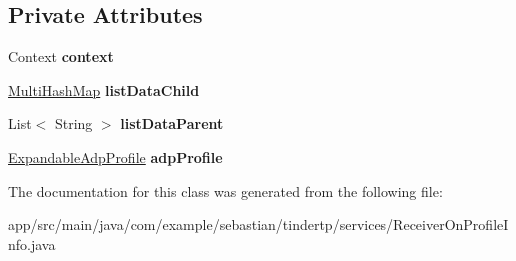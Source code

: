 \subsection*{Private Attributes}
\begin{DoxyCompactItemize}
\item 
Context {\bfseries context}\hypertarget{classcom_1_1example_1_1sebastian_1_1tindertp_1_1services_1_1ReceiverOnProfileInfo_a58de110f0b905eff3a7994239e4abd85}{}\label{classcom_1_1example_1_1sebastian_1_1tindertp_1_1services_1_1ReceiverOnProfileInfo_a58de110f0b905eff3a7994239e4abd85}

\item 
\hyperlink{classcom_1_1example_1_1sebastian_1_1tindertp_1_1commonTools_1_1MultiHashMap}{Multi\+Hash\+Map} {\bfseries list\+Data\+Child}\hypertarget{classcom_1_1example_1_1sebastian_1_1tindertp_1_1services_1_1ReceiverOnProfileInfo_a3aec67560824d8459251ceea2c2b4155}{}\label{classcom_1_1example_1_1sebastian_1_1tindertp_1_1services_1_1ReceiverOnProfileInfo_a3aec67560824d8459251ceea2c2b4155}

\item 
List$<$ String $>$ {\bfseries list\+Data\+Parent}\hypertarget{classcom_1_1example_1_1sebastian_1_1tindertp_1_1services_1_1ReceiverOnProfileInfo_a08a466f4a49aa833f003edd2cd9feba1}{}\label{classcom_1_1example_1_1sebastian_1_1tindertp_1_1services_1_1ReceiverOnProfileInfo_a08a466f4a49aa833f003edd2cd9feba1}

\item 
\hyperlink{classcom_1_1example_1_1sebastian_1_1tindertp_1_1ExpandedListAdapters_1_1ExpandableAdpProfile}{Expandable\+Adp\+Profile} {\bfseries adp\+Profile}\hypertarget{classcom_1_1example_1_1sebastian_1_1tindertp_1_1services_1_1ReceiverOnProfileInfo_a269944bcb84fdce8bff23e0618c2f163}{}\label{classcom_1_1example_1_1sebastian_1_1tindertp_1_1services_1_1ReceiverOnProfileInfo_a269944bcb84fdce8bff23e0618c2f163}

\end{DoxyCompactItemize}


The documentation for this class was generated from the following file\+:\begin{DoxyCompactItemize}
\item 
app/src/main/java/com/example/sebastian/tindertp/services/Receiver\+On\+Profile\+Info.\+java\end{DoxyCompactItemize}
